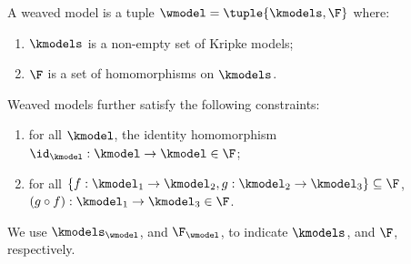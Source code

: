 \begin{definition}\label{def:wmodel}
  A weaved model is a tuple $\wmodel = \tuple{\kmodels, \F}$ where:
  \begin{enumerate}
    \setlength{\itemsep}{0pt}
    \item $\kmodels$ is a non-empty set of Kripke models;
    \item $\F$ is a set of homomorphisms on $\kmodels$.
  \end{enumerate}
  Weaved models further satisfy the following constraints:
  \begin{enumerate}[label=(\alph*)]
    \setlength{\itemsep}{0pt}
    \item for all $\kmodel$, the identity homomorphism ${\id_{\kmodel}: {\kmodel \to \kmodel}} \in \F$;
    \item for all $\{{f: {\kmodel_1 \to \kmodel_2}},{g: {\kmodel_2 \to \kmodel_3}}\} \subseteq \F$, ${(g \circ f): {\kmodel_1 \to \kmodel_3}} \in \F$.
  \end{enumerate}
  We use $\kmodels_{\wmodel}$, and $\F_{\wmodel}$, to indicate $\kmodels$, and $\F$, respectively.
\end{definition}


